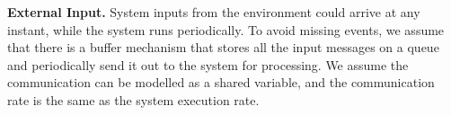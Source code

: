 {\bf External Input.} 
System inputs from the environment could arrive at any instant, while the system runs periodically. To avoid missing events, we assume that there is a buffer mechanism that stores all the input messages on a queue and periodically send it out to the system for processing. We assume the communication can be modelled as a shared variable, and the communication rate is the same as the system execution rate. 

%
%







